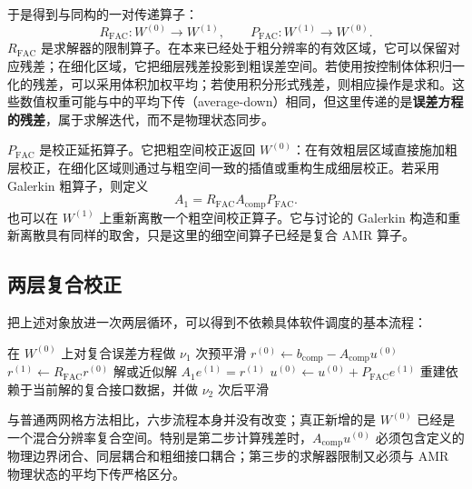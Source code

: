 于是得到与同构的一对传递算子：
\begin{equation}
R_{\mathrm{FAC}}:W^{(0)}\rightarrow W^{(1)},
\qquad
P_{\mathrm{FAC}}:W^{(1)}\rightarrow W^{(0)}.
\label{eq:fac-transfer}
\end{equation}
$R_{\mathrm{FAC}}$ 是求解器的限制算子。在本来已经处于粗分辨率的有效区域，它可以保留对应残差；在细化区域，它把细层残差投影到粗误差空间。若使用按控制体体积归一化的残差，可以采用体积加权平均；若使用积分形式残差，则相应操作是求和。这些数值权重可能与中的平均下传（average-down）相同，但这里传递的是\textbf{误差方程的残差}，属于求解迭代，而不是物理状态同步。

$P_{\mathrm{FAC}}$ 是校正延拓算子。它把粗空间校正返回 $W^{(0)}$：在有效粗层区域直接施加粗层校正，在细化区域则通过与粗空间一致的插值或重构生成细层校正。若采用 Galerkin 粗算子，则定义
\begin{equation}
A_1
=R_{\mathrm{FAC}}A_{\mathrm{comp}}P_{\mathrm{FAC}}.
\label{eq:fac-galerkin-operator}
\end{equation}
也可以在 $W^{(1)}$ 上重新离散一个粗空间校正算子。它与讨论的 Galerkin 构造和重新离散具有同样的取舍，只是这里的细空间算子已经是复合 AMR 算子。

\subsection{两层复合校正}
\label{sec:fac-cycle-skeleton}

把上述对象放进一次两层循环，可以得到不依赖具体软件调度的基本流程：
\begin{algorithm}[htbp]
\caption{两层 FAC 型复合校正}
\begin{algorithmic}[1]
\State 在 $W^{(0)}$ 上对复合误差方程做 $\nu_1$ 次预平滑
\State $r^{(0)}\gets b_{\mathrm{comp}}-A_{\mathrm{comp}}u^{(0)}$
\State $r^{(1)}\gets R_{\mathrm{FAC}}r^{(0)}$
\State 解或近似解 $A_1e^{(1)}=r^{(1)}$
\State $u^{(0)}\gets u^{(0)}+P_{\mathrm{FAC}}e^{(1)}$
\State 重建依赖于当前解的复合接口数据，并做 $\nu_2$ 次后平滑
\end{algorithmic}
\end{algorithm}

与普通两网格方法相比，六步流程本身并没有改变；真正新增的是 $W^{(0)}$ 已经是一个混合分辨率复合空间。特别是第二步计算残差时，$A_{\mathrm{comp}}u^{(0)}$ 必须包含定义的物理边界闭合、同层耦合和粗细接口耦合；第三步的求解器限制又必须与 AMR 物理状态的平均下传严格区分。

